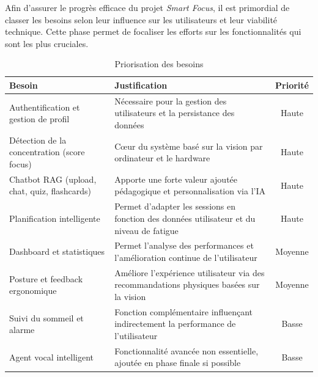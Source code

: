 Afin d'assurer le progrès efficace du projet \textit{Smart Focus}, il est primordial de classer les besoins selon leur influence sur les utilisateurs et leur viabilité technique. Cette phase permet de focaliser les efforts sur les fonctionnalités qui sont les plus cruciales.

\vspace{0.5em}
\begin{table}[H]
    \centering
    \renewcommand{\arraystretch}{1.3}
    
    \begin{tabular}{|p{5cm}|p{6.5cm}|c|}
        \hline
        \textbf{Besoin} & \textbf{Justification} & \textbf{Priorité} \\ \hline
        
        Authentification et gestion de profil 
        & Nécessaire pour la gestion des utilisateurs et la persistance des données 
        & Haute \\ \hline
        
        Détection de la concentration (score focus) 
        & Cœur du système basé sur la vision par ordinateur et le hardware 
        & Haute \\ \hline
        
        Chatbot \ac{RAG} (upload, chat, quiz, flashcards) 
        & Apporte une forte valeur ajoutée pédagogique et personnalisation via l’IA 
        & Haute \\ \hline
        
        Planification intelligente 
        & Permet d’adapter les sessions en fonction des données utilisateur et du niveau de fatigue 
        & Haute \\ \hline
        
        Dashboard et statistiques 
        & Permet l’analyse des performances et l’amélioration continue de l’utilisateur 
        & Moyenne \\ \hline
        
        Posture et feedback ergonomique 
        & Améliore l’expérience utilisateur via des recommandations physiques basées sur la vision 
        & Moyenne \\ \hline
        
        Suivi du sommeil et alarme 
        & Fonction complémentaire influençant indirectement la performance de l’utilisateur 
        & Basse \\ \hline
        
        Agent vocal intelligent 
        & Fonctionnalité avancée non essentielle, ajoutée en phase finale si possible 
        & Basse \\ \hline
        
    \end{tabular}

    \caption{Priorisation des besoins}
    \label{tab:priorisation_besoins}
\end{table}

